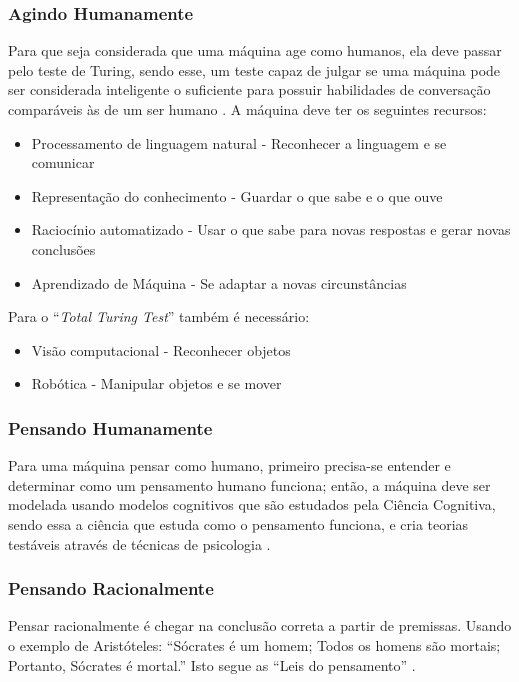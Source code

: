 \documentclass[
	12pt,				%
	openright,			%
	oneside,			%
	a4paper,			%
	english,			%
	spanish,			%
	brazil				%
	]{abntex2}
\begin{document}
	\subsubsection*{Agindo Humanamente}
		Para que seja considerada que uma máquina age como humanos, ela deve passar pelo teste de Turing, sendo esse, um teste capaz de julgar se uma máquina pode ser considerada inteligente o suficiente para possuir habilidades de conversação comparáveis às de um ser humano \cite{turing}. A máquina deve ter os seguintes recursos:
		
		\begin{itemize}
  			\item Processamento de linguagem natural - Reconhecer a linguagem e se comunicar
  			\item Representação do conhecimento - Guardar o que sabe e o que ouve
  			\item Raciocínio automatizado - Usar o que sabe para novas respostas e gerar novas conclusões
  			\item Aprendizado de Máquina - Se adaptar a novas circunstâncias
  		\end{itemize}
  			
  			Para o ``\emph{Total Turing Test}'' também é necessário:
  			
  		\begin{itemize}
  			\item Visão computacional - Reconhecer objetos
  			\item Robótica - Manipular objetos e se mover
		\end{itemize}
		
	\subsubsection*{Pensando Humanamente}
		Para uma máquina pensar como humano, primeiro precisa-se entender e determinar como um pensamento humano funciona; então, a máquina deve ser modelada usando modelos cognitivos que são estudados pela Ciência Cognitiva, sendo essa a ciência que estuda como o pensamento funciona, e cria teorias testáveis através de técnicas de psicologia \cite{wilson_keil}.
		
	\subsubsection*{Pensando Racionalmente}
		Pensar racionalmente é chegar na conclusão correta a partir de premissas. Usando o exemplo de Aristóteles: ``Sócrates é um homem; Todos os homens são mortais; Portanto, Sócrates é mortal.''  Isto segue as ``Leis do pensamento''  \cite{laws_of_thought}.
		
\end{document}
